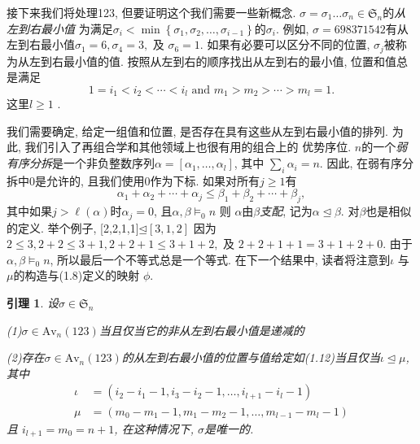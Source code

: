 \documentclass{ctexbook}
\newtheorem{lem}[thm]{引理}
\begin{document}
接下来我们将处理123, 但要证明这个我们需要一些新概念. $\sigma=\sigma_{1} \ldots \sigma_{n} \in \mathfrak{S}_{n}$的\textsl{从左到右最小值}
为满足$\sigma_{i}<\min \left\{\sigma_{1}, \sigma_{2}, \ldots, \sigma_{i-1}\right\}$的$\sigma_{i}$. 例如,
$\sigma=698371542$有从左到右最小值$\sigma_{1}=6, \sigma_{4}=3,$ 及 $\sigma_{6}=1$. 如果有必要可以区分不同的位置,
$\sigma_{j}$被称为从左到右最小值的值. 按照从左到右的顺序找出从左到右的最小值, 位置和值总是满足
\begin{equation}
    1=i_{1}<i_{2}<\cdots<i_{l} \text { and } m_{1}>m_{2}>\cdots>m_{l}=1.
\end{equation}
这里$l \geqslant 1$ .

我们需要确定, 给定一组值和位置, 是否存在具有这些从左到右最小值的排列. 为此, 我们引入了再组合学和其他领域上也很有用的组合上的
优势序位. $n$的一个\textsl{弱有序分拆}是一个非负整数序列$\alpha=\left[\alpha_{1}, \ldots, \alpha_{l}\right]$, 其中
$\sum_{i} \alpha_{i}=n$. 因此, 在弱有序分拆中0是允许的, 且我们使用0作为下标. 如果对所有$j \geqslant 1$有
$$
\alpha_{1}+\alpha_{2}+\cdots+\alpha_{j} \leqslant \beta_{1}+\beta_{2}+\cdots+\beta_{j},
$$
其中如果$j>\ell(\alpha)$时$\alpha_{j}=0$, 且$\alpha, \beta \models_{0} n$ 则 $\alpha$由$\beta$\textsl{支配},
记为$\alpha \unlhd \beta$. 对$\beta $也是相似的定义. 举个例子, [2,2,1,1]$\unlhd[3,1,2]$ 因为
 $2 \leqslant 3,2+2 \leqslant 3+1,2+2+1 \leqslant 3+1+2,$ 及 $2+2+1+1=3+1+2+0$. 由于$\alpha, \beta \models_{0} n$,
 所以最后一个不等式总是一个等式. 在下一个结果中, 读者将注意到$\iota$ 与 $\mu$的构造与(1.8)定义的映射 $\phi$.
     \begin{lem}
     	设$\sigma \in \mathfrak{S}_{n}$

       \noindent
     (1)$\sigma \in \mathrm{Av}_{n}(123)$当且仅当它的非从左到右最小值是递减的

     \noindent(2)存在$\sigma \in \mathrm{Av}_{n}(123)$的从左到右最小值的位置与值给定如(1.12)当且仅当$\iota \unlhd \mu$, 其中
      $$
      \begin{aligned}
      \iota &=\left(i_{2}-i_{1}-1, i_{3}-i_{2}-1, \ldots, i_{l+1}-i_{l}-1\right) \\
      \mu &=\left(m_{0}-m_{1}-1, m_{1}-m_{2}-1, \ldots, m_{l-1}-m_{l}-1\right)
      \end{aligned}
      $$
      且 $i_{l+1}=m_{0}=n+1$, 在这种情况下, $\sigma$是唯一的.
     \end{lem}
\end{document}
